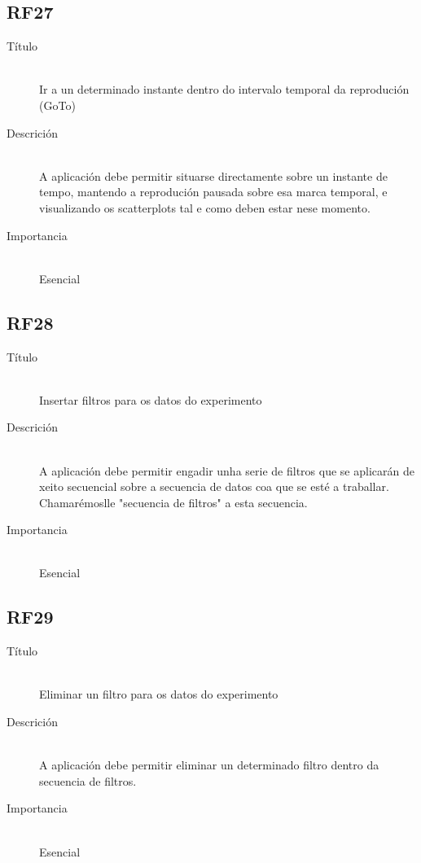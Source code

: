 \subsection*{RF27}
\begin{description}
\item[Título] \hfill \\
Ir a un determinado instante dentro do intervalo temporal da reprodución (GoTo)
\item[Descrición] \hfill \\
A aplicación debe permitir situarse directamente sobre un instante de tempo, mantendo a reprodución pausada sobre esa marca temporal, e visualizando os scatterplots tal e como deben estar nese momento.
\item[Importancia] \hfill \\
Esencial
\end{description}

\subsection*{RF28}
\begin{description}
\item[Título] \hfill \\
Insertar filtros para os datos do experimento
\item[Descrición] \hfill \\
A aplicación debe permitir engadir unha serie de filtros que se aplicarán de xeito secuencial sobre a secuencia de datos coa que se esté a traballar. Chamarémoslle "secuencia de filtros" a esta secuencia.
\item[Importancia] \hfill \\
Esencial
\end{description}

\subsection*{RF29}
\begin{description}
\item[Título] \hfill \\
Eliminar un filtro para os datos do experimento
\item[Descrición] \hfill \\
A aplicación debe permitir eliminar un determinado filtro dentro da secuencia de filtros.
\item[Importancia] \hfill \\
Esencial
\end{description}

